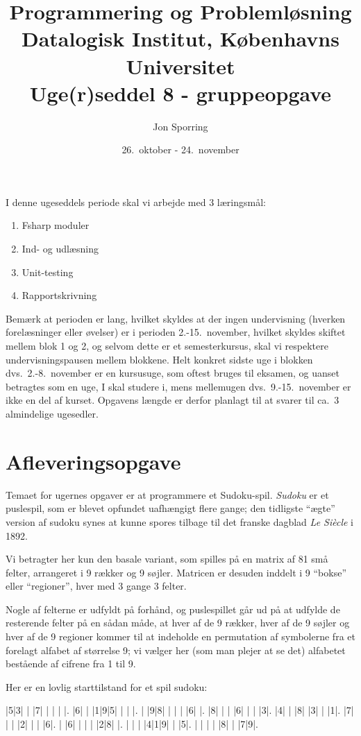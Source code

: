 \documentclass[a4paper,12pt]{article}
\title{Programmering og Problemløsning\\Datalogisk Institut,
  Københavns Universitet\\Uge(r)seddel 8 - gruppeopgave}
\author{Jon Sporring}
\date{26.\ oktober - 24.\ november}
\begin{document}
\maketitle

I denne ugeseddels periode skal vi arbejde med 3 læringsmål:
\begin{enumerate}
\item Fsharp moduler
\item Ind- og udlæsning
\item Unit-testing
\item Rapportskrivning
\end{enumerate}
Bemærk at perioden er lang, hvilket skyldes at der ingen undervisning (hverken forelæsninger eller øvelser) er i perioden 2.-15.\ november, hvilket skyldes skiftet mellem blok 1 og 2, og selvom dette er et semesterkursus, skal vi respektere undervisningspausen mellem blokkene. Helt konkret sidste uge i blokken dvs.\ 2.-8.\ november er en kursusuge, som oftest bruges til eksamen, og uanset betragtes som en uge, I skal studere i, mens mellemugen dvs.\ 9.-15.\ november er ikke en del af kurset. Opgavens længde er derfor planlagt til at svarer til ca.\ 3 almindelige ugesedler.

\section*{Afleveringsopgave}
Temaet for ugernes opgaver er at programmere et Sudoku-spil. \emph{Sudoku} er et puslespil, som er blevet opfundet uafh{\ae}ngigt flere gange; den tidligste ``{\ae}gte'' version af sudoku synes at kunne spores tilbage til det franske dagblad \emph{Le Si{\`e}cle} i 1892.

Vi betragter her kun den basale variant, som spilles p{\aa} en matrix af 81 sm{\aa} felter, arrangeret i 9 r{\ae}kker og 9 s{\o}jler.  Matricen er desuden inddelt i 9 ``bokse'' eller ``regioner'', hver med 3 gange 3 felter.

Nogle af felterne er udfyldt p{\aa} forh{\aa}nd, og puslespillet g{\aa}r ud p{\aa} at udfylde de resterende felter p{\aa} en s{\aa}dan m{\aa}de, at hver af de 9 r{\ae}kker, hver af de 9 s{\o}jler og hver af de 9 regioner kommer til at indeholde en permutation af symbolerne fra et forelagt alfabet af st{\o}rrelse 9; vi v{\ae}lger her (som man plejer at se det) alfabetet best{\aa}ende af cifrene fra 1 til 9.

Her er en lovlig starttilstand for et spil sudoku:
\begin{sudoku}
|5|3| | |7| | | | |.
|6| | |1|9|5| | | |.
| |9|8| | | | |6| |.
|8| | | |6| | | |3|.
|4| | |8| |3| | |1|.
|7| | | |2| | | |6|.
| |6| | | | |2|8| |.
| | | |4|1|9| | |5|.
| | | | |8| | |7|9|.
\end{sudoku}
\end{document}
